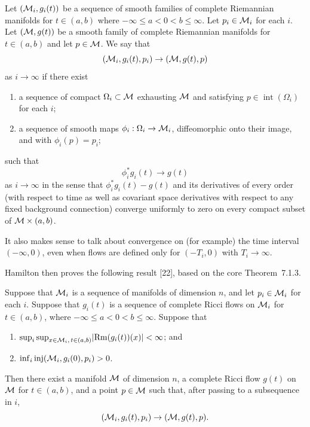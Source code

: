 \begin{definition}
\label{topping-ch7-flow-convergence}
Let $(\mathcal{M}_i,g_i(t))$ be a sequence of smooth families of complete Riemannian
manifolds for $t \in (a,b)$ where $-\infty \le a < 0 < b \le \infty$. Let
$p_i \in \mathcal{M}_i$ for each $i$. Let $(\mathcal{M},g(t))$ be a smooth family of complete
Riemannian manifolds for $t \in (a,b)$ and let $p \in \mathcal{M}$. We say that
\[
(\mathcal{M}_i,g_i(t),p_i) \to (\mathcal{M},g(t),p)
\]
as $i \to \infty$ if there exist
\begin{enumerate}
\item[(i)] a sequence of compact $\Omega_i \subset \mathcal{M}$ exhausting $\mathcal{M}$ and
satisfying $p \in \operatorname{int}(\Omega_i)$ for each $i$;
\item[(ii)] a sequence of smooth maps $\phi_i : \Omega_i \to \mathcal{M}_i$, diffeomorphic
onto their image, and with $\phi_i(p)=p_i$;
\end{enumerate}
such that
\[
\phi_i^{*} g_i(t) \to g(t)
\]
as $i \to \infty$ in the sense that $\phi_i^{*} g_i(t)-g(t)$ and its
derivatives of every order (with respect to time as well as covariant space
derivatives with respect to any fixed background connection) converge
uniformly to zero on every compact subset of $\mathcal{M} \times (a,b)$.
\end{definition}

\begin{remark}
\label{topping-ch7-flow-backward-interval}
It also makes sense to talk about convergence on (for example) the time
interval $(-\infty,0)$, even when flows are defined only for $(-T_i,0)$ with
$T_i \to \infty$.
\end{remark}

Hamilton then proves the following result [22], based on the core
Theorem~7.1.3.

\begin{theorem}
\label{topping-ch7-compactness-ricci-flows}
Suppose that $\mathcal{M}_i$ is a sequence of manifolds of dimension $n$, and let
$p_i \in \mathcal{M}_i$ for each $i$. Suppose that $g_i(t)$ is a sequence of complete
Ricci flows on $\mathcal{M}_i$ for $t \in (a,b)$, where $-\infty \le a < 0 < b \le
\infty$. Suppose that
\begin{enumerate}
\item[(i)] $\sup_i \sup_{x \in \mathcal{M}_i,\, t \in (a,b)} \lvert \operatorname{Rm}(g_i(t))(x)\rvert < \infty$; and
\item[(ii)] $\inf_i \operatorname{inj}(\mathcal{M}_i,g_i(0),p_i) > 0$.
\end{enumerate}
Then there exist a manifold $\mathcal{M}$ of dimension $n$, a complete Ricci flow
$g(t)$ on $\mathcal{M}$ for $t \in (a,b)$, and a point $p \in \mathcal{M}$ such that, after
passing to a subsequence in $i$,
\[
(\mathcal{M}_i,g_i(t),p_i) \to (\mathcal{M},g(t),p).
\]
\end{theorem}

